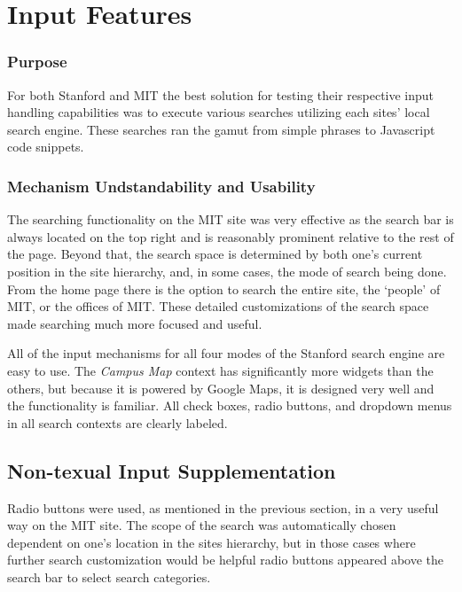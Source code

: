 \section*{Input Features}

\subsubsection*{Purpose}

For both Stanford and MIT the best solution for testing their respective input handling capabilities was to execute
various searches utilizing each sites' local search engine. These searches ran the gamut from simple phrases to
Javascript code snippets.

\subsubsection*{Mechanism Undstandability and Usability}

            The searching functionality on the MIT site was very effective as the search
            bar is always located on the top right and is reasonably prominent relative
            to the rest of the page. Beyond that, the search space is determined by both
            one's current position in the site hierarchy, and, in some cases, the mode
            of search being done. From the home page there is the option to search the
            entire site, the `people' of MIT, or the offices of MIT. These detailed
            customizations of the search space made searching much more focused and useful.

            All of the input mechanisms for all four modes of the Stanford search
            engine are easy to use. The \textsl{Campus Map} context has significantly
            more widgets than the others, but because it is powered by Google Maps,
            it is designed very well and the functionality is familiar. All
            check boxes, radio buttons, and dropdown menus in all search contexts
            are clearly labeled.

\subsection*{Non-texual Input Supplementation}

            Radio buttons were used, as mentioned in the previous section, in a very useful
            way on the MIT site. The scope of the search was automatically chosen dependent
            on one's location in the sites hierarchy, but in those cases where further search
            customization would be helpful radio buttons appeared above the search bar to select
            search categories.


